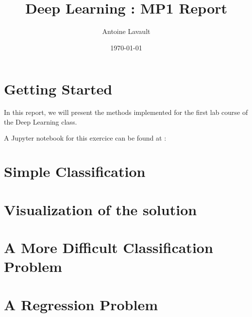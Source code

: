 \documentclass[]{article}
\title{Deep Learning : MP1 Report}
\author{Antoine Lavault}
\date{\today}
\begin{document}
\maketitle

\section*{Getting Started}

In this report, we will present the methods implemented for the first lab course of the Deep Learning class.

A Jupyter notebook for this exercice can be found at :


\section{Simple Classification}

\section{Visualization of the solution}

\section{A More Difficult Classification Problem}

\section{A Regression Problem}
\end{document}
